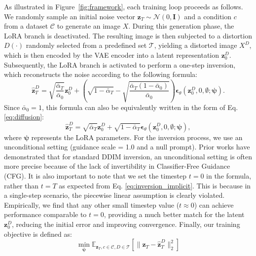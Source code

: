 \documentclass{article}
\begin{document}
As illustrated in Figure~\ref{fig:framework}, each training loop proceeds as follows. We randomly sample an initial noise vector $\boldsymbol{z}_T \sim \mathcal{N}(0, \boldsymbol{I})$ and a condition $c$ from a dataset $\mathcal{C}$ to generate an image $X$. During this generation phase, the LoRA branch is deactivated. The resulting image is then subjected to a distortion $D(\cdot)$ randomly selected from a predefined set $\mathcal{T}$, yielding a distorted image $X^D$, which is then encoded by the VAE encoder into a latent representation $\boldsymbol{z}_0^D$. Subsequently, the LoRA branch is activated to perform a one-step inversion, which reconstructs the noise according to the following formula:
\begin{equation}
\label{eq:eq9}
    \hat{\boldsymbol{z}}_T^D = \sqrt{\frac{\bar{\alpha}_T}{\bar{\alpha}_{0}}} \boldsymbol{z}{_0^D} + \left( \sqrt{1-\bar{\alpha}_T} - \sqrt{\frac{\bar{\alpha}_T(1 - \bar{\alpha}_{0})}{\bar{\alpha}_{0}}} \right) \boldsymbol{\epsilon}_\theta(\boldsymbol{z}_0^D, 0, \emptyset; \boldsymbol{\psi}).
\end{equation}
Since $\bar{\alpha}_0 = 1$, this formula can also be equivalently written in the form of Eq.\ref{eq:diffusion}:
\begin{equation}
    \hat{\boldsymbol{z}}_T^D = \sqrt{\bar{\alpha}_T} \boldsymbol{z}{_0^D} + \sqrt{1-\bar{\alpha}_T} \boldsymbol{\epsilon}_\theta(\boldsymbol{z}_0^D, 0, \emptyset; \boldsymbol{\psi}),
\end{equation}
where $\boldsymbol{\psi}$ represents the LoRA parameters. For the inversion process, we use an unconditional setting (guidance scale = 1.0 and a null prompt). Prior works \citep{nti2023, edict2023} have demonstrated that for standard DDIM inversion, an unconditional setting is often more precise because of the lack of invertibility in Classifier-Free Guidance \citep{cfg2022} (CFG). It is also important to note that we set the timestep $t=0$ in the formula, rather than $t=T$ as expected from Eq. \ref{eq:inversion_implicit}. This is because in a single-step scenario, the piecewise linear assumption is clearly violated. Empirically, we find that any other small timestep value ($t \approx 0$) can achieve performance comparable to $t = 0$, providing a much better match for the latent $\boldsymbol{z}_0^D$, reducing the initial error and improving convergence.
Finally, our training objective is defined as:
\begin{equation}
    \min_{\boldsymbol{\psi}} \mathbb{E}_{\boldsymbol{z}_T, c \in \mathcal{C}, D \in \mathcal{T}} \left[ \|\boldsymbol{z}_T - \hat{\boldsymbol{z}}_T^D\|_2^2 \right]
    \label{eq:loss}
\end{equation}
\end{document}
